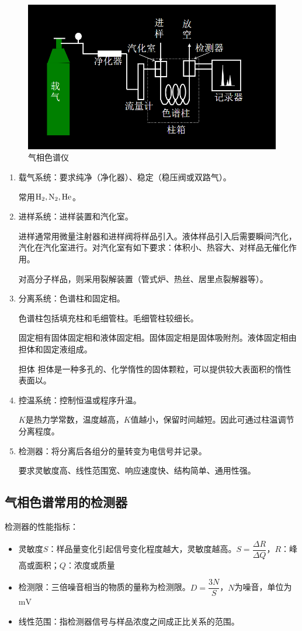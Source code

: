 \begin{figure}[!h]
	\centering
	\includegraphics[width=0.7\linewidth]{image/chp1_GC_apa}
	\caption{气相色谱仪}
	\label{fig:chp1gcapa}
\end{figure}
\begin{enumerate}
	\item 载气系统：要求纯净（净化器）、稳定（稳压阀或双路气）。
	
	常用$\ce{H2,N2,He}$。
	\item 进样系统：进样装置和汽化室。
	
	进样通常用微量注射器和进样阀将样品引入。液体样品引入后需要瞬间汽化，汽化在汽化室进行。对汽化室有如下要求：体积小、热容大、对样品无催化作用。
	
	对高分子样品，则采用裂解装置（管式炉、热丝、居里点裂解器等）。
	\item 分离系统：色谱柱和固定相。
	
	色谱柱包括填充柱和毛细管柱。毛细管柱较细长。
	
	固定相有固体固定相和液体固定相。固体固定相是固体吸附剂。液体固定相由担体和固定液组成。
	
	\begin{definition*}{担体}{}
		担体是一种多孔的、化学惰性的固体颗粒，可以提供较大表面积的惰性表面以。
	\end{definition*}
	\item 控温系统：控制恒温或程序升温。
	
	$K$是热力学常数，温度越高，$K$值越小，保留时间越短。因此可通过柱温调节分离程度。
	\item 检测器：将分离后各组分的量转变为电信号并记录。
	
	要求灵敏度高、线性范围宽、响应速度快、结构简单、通用性强。
\end{enumerate}

\subsection{气相色谱常用的检测器}
检测器的性能指标：
\begin{itemize}
	\item 灵敏度$S$：样品量变化引起信号变化程度越大，灵敏度越高。$S=\dfrac{\Delta R}{\Delta  Q}$，$R$：峰高或面积；$Q$：浓度或质量
	\item 检测限：三倍噪音相当的物质的量称为检测限。$D=\dfrac{3N}{S}$，$N$为噪音，单位为$\mathrm{mV}$
	\item 线性范围：指检测器信号与样品浓度之间成正比关系的范围。
\end{itemize}

